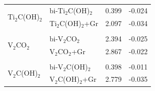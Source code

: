 \begin{table}[htb]
\begin{tabularx}{0.8\linewidth}{XXXX}
\multirow{2}{*}{Ti$_2$C(OH)$_2$} & bi-Ti$_2$C(OH)$_2$                                               & 0.399                   & -0.024                         \\
              & Ti$_2$C(OH)$_2$+Gr                                                  & 2.097                    & -0.034                         \\
\multicolumn{4}{c}{}\\             
\multirow{2}{*}{V$_2$CO$_2$}     & bi-V$_2$CO$_2$                                                 & 2.394                    & -0.025                         \\
              & V$_2$CO$_2$+Gr                                                     & 2.867                    & -0.022                         \\
\multicolumn{4}{c}{}\\              
\multirow{2}{*}{V$_2$C(OH)$_2$}  & bi-V$_2$C(OH)$_2$                                              & 0.398                    & -0.011                         \\
              & V$_2$C(OH)$_2$+Gr                                                 & 2.779                    & -0.035                         \\ \hline                     
\end{tabularx}
\end{table}

